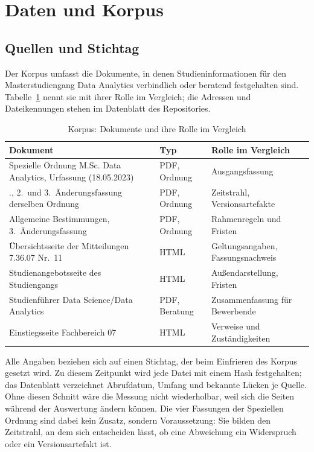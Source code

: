 
\section{Daten und Korpus}
\label{sec:daten}

\subsection{Quellen und Stichtag}

Der Korpus umfasst die Dokumente, in denen Studieninformationen für den Masterstudiengang
Data Analytics verbindlich oder beratend festgehalten sind. Tabelle~\ref{tab:korpus} nennt
sie mit ihrer Rolle im Vergleich; die Adressen und Dateikennungen stehen im Datenblatt des
Repositories.

\begin{table}[ht]
  \centering
  \caption{Korpus: Dokumente und ihre Rolle im Vergleich}
  \label{tab:korpus}
  \small
  \begin{tabular}{@{}>{\raggedright\arraybackslash}p{}>{\raggedright\arraybackslash}p{}>{\raggedright\arraybackslash}p{}@{}}
    \toprule
    Dokument & Typ & Rolle im Vergleich \\
    \midrule
    Spezielle Ordnung M.Sc. Data Analytics, Urfassung (18.05.2023) & PDF, Ordnung & Ausgangsfassung \\
    1., 2.\ und 3.\ Änderungsfassung derselben Ordnung & PDF, Ordnung & Zeitstrahl, Versionsartefakte \\
    Allgemeine Bestimmungen, 3.\ Änderungsfassung & PDF, Ordnung & Rahmenregeln und Fristen \\
    Übersichtsseite der Mitteilungen 7.36.07 Nr.~11 & HTML & Geltungsangaben, Fassungsnachweis \\
    Studienangebotsseite des Studiengangs & HTML & Außendarstellung, Fristen \\
    Studienführer Data Science/Data Analytics & PDF, Beratung & Zusammenfassung für Bewerbende \\
    Einstiegsseite Fachbereich 07 & HTML & Verweise und Zuständigkeiten \\
    \bottomrule
  \end{tabular}
\end{table}

Alle Angaben beziehen sich auf einen Stichtag, der beim Einfrieren des Korpus gesetzt wird.
Zu diesem Zeitpunkt wird jede Datei mit einem Hash festgehalten; das Datenblatt verzeichnet
Abrufdatum, Umfang und bekannte Lücken je Quelle. Ohne diesen Schnitt wäre die Messung nicht
wiederholbar, weil sich die Seiten während der Auswertung ändern können. Die vier Fassungen
der Speziellen Ordnung sind dabei kein Zusatz, sondern Voraussetzung: Sie bilden den
Zeitstrahl, an dem sich entscheiden lässt, ob eine Abweichung ein Widerspruch oder ein
Versionsartefakt ist.

